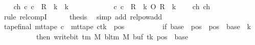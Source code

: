 \begin{isabellebody}
\ \ \isamarkupfalse%
\ ch{}{}{\isacharcolon}{\kern0pt}\ {\isachardoublequoteopen}{\isacharparenleft}{\kern0pt}c{\isacharprime}{\kern0pt}{\isacharcomma}{\kern0pt}\ c{}{\isacharparenright}{\kern0pt}\ {\isasymin}\ {\isacharquery}{\kern0pt}R\ {\isacharcircum}{\kern0pt}{\isacharcircum}{\kern0pt}\ {\isacharparenleft}{\kern0pt}{\isacharquery}{\kern0pt}k\ {\isacharplus}{\kern0pt}\ {\isacharparenleft}{\kern0pt}{\isacharquery}{\kern0pt}k\ {\isacharminus}{\kern0pt}\ {}{\isacharparenright}{\kern0pt}{\isacharparenright}{\kern0pt}{\isachardoublequoteclose}\isanewline
\ \ \isamarkupfalse%
\ {\isacharminus}{\kern0pt}\isanewline
\ \ \ \ \isamarkupfalse%
\ {\isachardoublequoteopen}{\isacharparenleft}{\kern0pt}c{\isacharprime}{\kern0pt}{\isacharcomma}{\kern0pt}\ c{}{\isacharparenright}{\kern0pt}\ {\isasymin}\ {\isacharquery}{\kern0pt}R\ {\isacharcircum}{\kern0pt}{\isacharcircum}{\kern0pt}\ {\isacharquery}{\kern0pt}k\ O\ {\isacharquery}{\kern0pt}R\ {\isacharcircum}{\kern0pt}{\isacharcircum}{\kern0pt}\ {\isacharparenleft}{\kern0pt}{\isacharquery}{\kern0pt}k\ {\isacharminus}{\kern0pt}\ {}{\isacharparenright}{\kern0pt}{\isachardoublequoteclose}\ \isamarkupfalse%
\ ch{}\ ch{}\ \isamarkupfalse%
\ {\isacharparenleft}{\kern0pt}rule\ relcompI{\isacharparenright}{\kern0pt}\isanewline
\ \ \ \ \isamarkupfalse%
\ {\isacharquery}{\kern0pt}thesis\ \isamarkupfalse%
\ {\isacharparenleft}{\kern0pt}simp\ add{\isacharcolon}{\kern0pt}\ relpow{\isacharunderscore}{\kern0pt}add{\isacharparenright}{\kern0pt}\isanewline
\ \ \isamarkupfalse%
\isanewline
\ \ \isamarkupfalse%
\ tape{\isacharunderscore}{\kern0pt}final{\isacharcolon}{\kern0pt}\ {\isachardoublequoteopen}mt{\isacharunderscore}{\kern0pt}tape\ c{}\ {\isacharequal}{\kern0pt}\ {\isacharparenleft}{\kern0pt}mt{\isacharunderscore}{\kern0pt}tape\ c{\isacharprime}{\kern0pt}{\isacharparenright}{\kern0pt}{\isacharparenleft}{\kern0pt}tk\ {\isacharcolon}{\kern0pt}{\isacharequal}{\kern0pt}\ {\isacharparenleft}{\kern0pt}{\isasymlambda}pos{\isachardot}{\kern0pt}\isanewline
\ \ \ \ \ \ \ \ \ \ if\ base\ {\isasymle}\ pos\ {\isasymand}\ pos\ {\isacharless}{\kern0pt}\ base\ {\isacharplus}{\kern0pt}\ {\isacharparenleft}{\kern0pt}{\isacharquery}{\kern0pt}k\ {\isacharminus}{\kern0pt}\ {}{\isacharparenright}{\kern0pt}\isanewline
\ \ \ \ \ \ \ \ \ \ then\ write{\isacharunderscore}{\kern0pt}bit\ {\isacharparenleft}{\kern0pt}{\isasymGamma}{\isacharunderscore}{\kern0pt}tm\ M{\isacharparenright}{\kern0pt}\ {\isacharparenleft}{\kern0pt}bl{\isacharunderscore}{\kern0pt}tm\ M{\isacharparenright}{\kern0pt}\ {\isacharparenleft}{\kern0pt}buf\ tk{\isacharparenright}{\kern0pt}\ {\isacharparenleft}{\kern0pt}pos\ {\isacharminus}{\kern0pt}\ base{\isacharparenright}{\kern0pt}\isanewline

\end{isabellebody}
